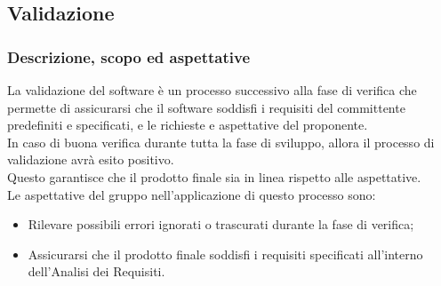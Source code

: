 \nonstopmode
\subsection{Validazione}

\subsubsection{Descrizione, scopo ed aspettative}

La validazione del software è un processo successivo alla fase di verifica che permette di assicurarsi che il software soddisfi i requisiti del committente predefiniti e specificati,
e le richieste e aspettative del proponente. \\

In caso di buona verifica durante tutta la fase di sviluppo, allora il processo di validazione avrà esito positivo. \\
Questo garantisce che il prodotto finale sia in linea rispetto alle aspettative. \\

Le aspettative del gruppo nell'applicazione di questo processo sono:
\begin{itemize}
    \item Rilevare possibili errori ignorati o trascurati durante la fase di verifica;
    \item Assicurarsi che il prodotto finale soddisfi i requisiti specificati all'interno dell'Analisi dei Requisiti.
\end{itemize}

